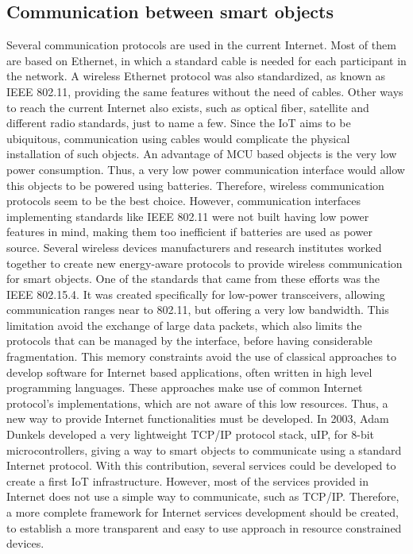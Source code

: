 \subsection{Communication between smart objects}
Several communication protocols are used in the current Internet.
Most of them are based on Ethernet, in which a standard cable is needed for each participant in the network.
A wireless Ethernet protocol was also standardized, as known as IEEE 802.11, providing the same features without the need of cables.
Other ways to reach the current Internet also exists, such as optical fiber, satellite and different radio standards, just to name a few.
Since the IoT aims to be ubiquitous, communication using cables would complicate the physical installation of such objects.
An advantage of MCU based objects is the very low power consumption.
Thus, a very low power communication interface would allow this objects to be powered using batteries.
Therefore, wireless communication protocols seem to be the best choice.
However, communication interfaces implementing standards like IEEE 802.11 were not built having low power features in mind, making them too inefficient if batteries are used as power source.
Several wireless devices manufacturers and research institutes worked together to create new energy-aware protocols to provide wireless communication for smart objects.
One of the standards that came from these efforts was the IEEE 802.15.4.
It was created specifically for low-power transceivers, allowing communication ranges near to 802.11, but offering a very low bandwidth.
This limitation avoid the exchange of large data packets, which also limits the protocols that can be managed by the interface, before having considerable fragmentation.
This memory constraints avoid the use of classical approaches to develop software for Internet based applications, often written in high level programming languages.
These approaches make use of common Internet protocol's implementations, which are not aware of this low resources.
Thus, a new way to provide Internet functionalities must be developed.
In 2003, Adam Dunkels developed a very lightweight TCP/IP protocol stack, uIP\cite{dunkels03full}, for 8-bit microcontrollers, giving a way to smart objects to communicate using a standard Internet protocol.
With this contribution, several services could be developed to create a first IoT infrastructure.
However, most of the services provided in Internet does not use a simple way to communicate, such as TCP/IP.
Therefore, a more complete framework for Internet services development should be created, to establish a more transparent and easy to use approach in resource constrained devices.

